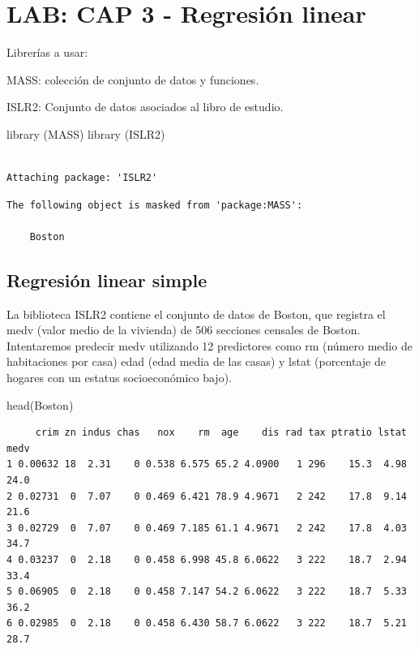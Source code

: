 \documentclass[
  letterpaper,
  DIV=11,
  numbers=noendperiod]{scrartcl}
\newenvironment{Shaded}{\begin{snugshade}}{\end{snugshade}}
\newcommand{\FunctionTok}[1]{\textcolor[rgb]{0.28,0.35,0.67}{#1}}
\newcommand{\NormalTok}[1]{\textcolor[rgb]{0.00,0.23,0.31}{#1}}
\begin{document}
\hypertarget{lab-cap-3---regresiuxf3n-linear}{%
\section{LAB: CAP 3 - Regresión
linear}\label{lab-cap-3---regresiuxf3n-linear}}

Librerías a usar:

MASS: colección de conjunto de datos y funciones.

ISLR2: Conjunto de datos asociados al libro de estudio.

\begin{Shaded}
\begin{Highlighting}[]
\FunctionTok{library}\NormalTok{ (MASS)}
\FunctionTok{library}\NormalTok{ (ISLR2)}
\end{Highlighting}
\end{Shaded}

\begin{verbatim}

Attaching package: 'ISLR2'
\end{verbatim}

\begin{verbatim}
The following object is masked from 'package:MASS':

    Boston
\end{verbatim}

\hypertarget{regresiuxf3n-linear-simple-1}{%
\subsection{Regresión linear
simple}\label{regresiuxf3n-linear-simple-1}}

La biblioteca ISLR2 contiene el conjunto de datos de Boston, que
registra el medv (valor medio de la vivienda) de 506 secciones censales
de Boston. Intentaremos predecir medv utilizando 12 predictores como rm
(número medio de habitaciones por casa) edad (edad media de las casas) y
lstat (porcentaje de hogares con un estatus socioeconómico bajo).

\begin{Shaded}
\begin{Highlighting}[]
\FunctionTok{head}\NormalTok{(Boston)}
\end{Highlighting}
\end{Shaded}

\begin{verbatim}
     crim zn indus chas   nox    rm  age    dis rad tax ptratio lstat medv
1 0.00632 18  2.31    0 0.538 6.575 65.2 4.0900   1 296    15.3  4.98 24.0
2 0.02731  0  7.07    0 0.469 6.421 78.9 4.9671   2 242    17.8  9.14 21.6
3 0.02729  0  7.07    0 0.469 7.185 61.1 4.9671   2 242    17.8  4.03 34.7
4 0.03237  0  2.18    0 0.458 6.998 45.8 6.0622   3 222    18.7  2.94 33.4
5 0.06905  0  2.18    0 0.458 7.147 54.2 6.0622   3 222    18.7  5.33 36.2
6 0.02985  0  2.18    0 0.458 6.430 58.7 6.0622   3 222    18.7  5.21 28.7
\end{verbatim}
\end{document}
